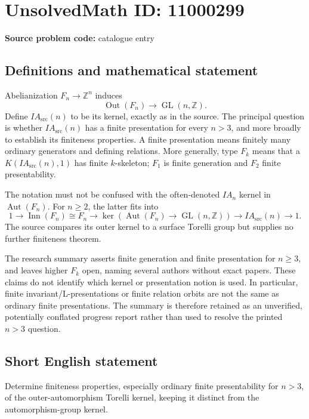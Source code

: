 \documentclass[11pt]{article}
\newcommand{\Z}{\mathbb{Z}}
\begin{document}
\section*{UnsolvedMath ID: 11000299}
\textbf{Source problem code:} catalogue entry
\subsection{Definitions and mathematical statement}
Abelianization \(F_n\to\Z^n\) induces
\[
 \operatorname{Out}(F_n)\longrightarrow\operatorname{GL}(n,\Z).
\]
Define \(IA_{\mathrm{src}}(n)\) to be its kernel, exactly as in the source. The principal question is whether \(IA_{\mathrm{src}}(n)\) has a finite presentation for every \(n>3\), and more broadly to establish its finiteness properties. A finite presentation means finitely many ordinary generators and defining relations. More generally, type \(F_k\) means that a \(K(IA_{\mathrm{src}}(n),1)\) has finite \(k\)-skeleton; \(F_1\) is finite generation and \(F_2\) finite presentability.

The notation must not be confused with the often-denoted \(IA_n\) kernel in \(\operatorname{Aut}(F_n)\). For \(n\geq2\), the latter fits into
\[
 1\longrightarrow\operatorname{Inn}(F_n)\cong F_n
 \longrightarrow\ker(\operatorname{Aut}(F_n)\to\operatorname{GL}(n,\Z))
 \longrightarrow IA_{\mathrm{src}}(n)\longrightarrow1.
\]
The source compares its outer kernel to a surface Torelli group but supplies no further finiteness theorem.

The research summary asserts finite generation and finite presentation for \(n\geq3\), and leaves higher \(F_k\) open, naming several authors without exact papers. These claims do not identify which kernel or presentation notion is used. In particular, finite invariant/L-presentations or finite relation orbits are not the same as ordinary finite presentations. The summary is therefore retained as an unverified, potentially conflated progress report rather than used to resolve the printed \(n>3\) question.
\subsection{Short English statement}
Determine finiteness properties, especially ordinary finite presentability for \(n>3\), of the outer-automorphism Torelli kernel, keeping it distinct from the automorphism-group kernel.
\end{document}
